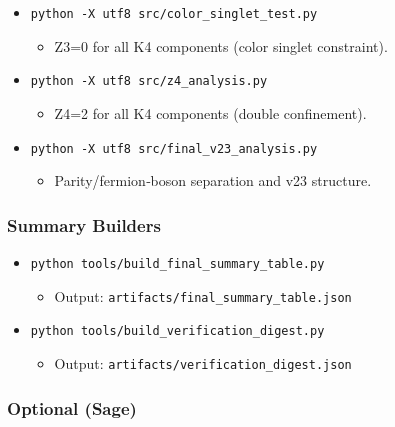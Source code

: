 \documentclass[11pt]{article}
\providecommand{\tightlist}{%
  \setlength{\itemsep}{0pt}\setlength{\parskip}{0pt}}
\begin{document}
\begin{itemize}
\tightlist
\item
  \texttt{python\ -X\ utf8\ src/color\_singlet\_test.py}

  \begin{itemize}
  \tightlist
  \item
    Z3=0 for all K4 components (color singlet constraint).
  \end{itemize}
\item
  \texttt{python\ -X\ utf8\ src/z4\_analysis.py}

  \begin{itemize}
  \tightlist
  \item
    Z4=2 for all K4 components (double confinement).
  \end{itemize}
\item
  \texttt{python\ -X\ utf8\ src/final\_v23\_analysis.py}

  \begin{itemize}
  \tightlist
  \item
    Parity/fermion‑boson separation and v23 structure.
  \end{itemize}
\end{itemize}

\subsubsection{Summary Builders}\label{summary-builders}

\begin{itemize}
\tightlist
\item
  \texttt{python\ tools/build\_final\_summary\_table.py}

  \begin{itemize}
  \tightlist
  \item
    Output: \texttt{artifacts/final\_summary\_table.json}
  \end{itemize}
\item
  \texttt{python\ tools/build\_verification\_digest.py}

  \begin{itemize}
  \tightlist
  \item
    Output: \texttt{artifacts/verification\_digest.json}
  \end{itemize}
\end{itemize}

\subsubsection{Optional (Sage)}\label{optional-sage}
\end{document}
